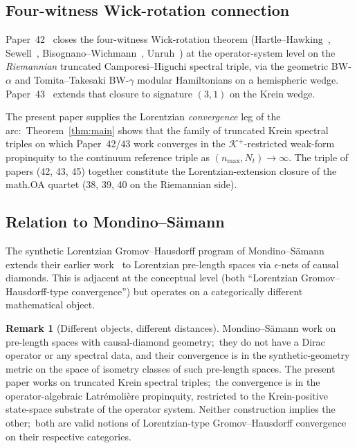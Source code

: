 \documentclass[11pt,a4paper]{article}
\theoremstyle{plain}
\theoremstyle{definition}
\newtheorem{remark}[theorem]{Remark}
\newcommand{\nmax}{n_{\max}}
\newcommand{\Nt}{N_{t}}
\newcommand{\Krein}{\mathcal{K}}
\newcommand{\Kplus}{\Krein^{+}}
\begin{document}
\subsection{Four-witness Wick-rotation connection}\label{sec:four_witness}

Paper~42~\cite{paper42} closes the four-witness Wick-rotation theorem
(Hartle--Hawking~\cite{hartle_hawking1976},
Sewell~\cite{sewell1982},
Bisognano--Wichmann~\cite{bisognano_wichmann1976},
Unruh~\cite{unruh1976}) at the operator-system level on the
\emph{Riemannian} truncated Camporesi--Higuchi spectral triple, via the
geometric BW-$\alpha$ and Tomita--Takesaki BW-$\gamma$ modular
Hamiltonians on a hemispheric wedge. Paper~43~\cite{paper43} extends
that closure to signature $(3, 1)$ on the Krein wedge.

The present paper supplies the Lorentzian \emph{convergence} leg of the
arc:\ Theorem~\ref{thm:main} shows that the family of truncated
Krein spectral triples on which Paper~42/43 work converges in the
$\Kplus$-restricted weak-form propinquity to the continuum reference
triple as $(\nmax, \Nt) \to \infty$. The triple of papers
(42, 43, 45) together constitute the Lorentzian-extension closure of
the math.OA quartet (38, 39, 40 on the Riemannian side).

\subsection{Relation to Mondino--S\"amann}\label{sec:mondino_samann}

The synthetic Lorentzian Gromov--Hausdorff program of
Mondino--S\"amann~\cite{mondino_samann2025} extends their earlier
work~\cite{mondino_samann2024} to Lorentzian pre-length spaces via
$\epsilon$-nets of causal diamonds. This is adjacent at the conceptual
level (both ``Lorentzian Gromov--Hausdorff-type convergence'') but
operates on a categorically different mathematical object.

\begin{remark}[Different objects, different distances]\label{rem:mondino_samann}
Mondino--S\"amann work on pre-length spaces with causal-diamond
geometry;\ they do not have a Dirac operator or any spectral data, and
their convergence is in the synthetic-geometry metric on the space of
isometry classes of such pre-length spaces. The present paper works on
truncated Krein spectral triples;\ the convergence is in the operator-algebraic
Latr\'emoli\`ere propinquity, restricted to the Krein-positive
state-space substrate of the operator system. Neither construction
implies the other;\ both are valid notions of Lorentzian-type
Gromov--Hausdorff convergence on their respective categories.
\end{remark}
\end{document}
